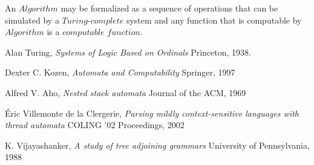 \documentclass{article}
\begin{document}
An $Algorithm$ may be formalized as a sequence of operations that
can be simulated by a $Turing$-$complete$ system and any function
that is computable by $Algorithm$ is a $computable$ $function$.

\begin{thebibliography}{9}

    Alan Turing,
    \emph{Systems of Logic Based on Ordinals}
    Princeton,
    1938.

    Dexter C. Kozen,
    \emph{Automata and Computability}
    Springer,
    1997

    Alfred V. Aho,
    \emph{Nested stack automata}
    Journal of the ACM,
    1969

    Éric Villemonte de la Clergerie,
    \emph{Parsing mildly context-sensitive languages with thread automata}
    COLING '02 Proceedings,
    2002

    K. Vijayashanker,
    \emph{A study of tree adjoining grammars}
    University of Pennsylvania,
    1988

\end{thebibliography}
\end{document}
